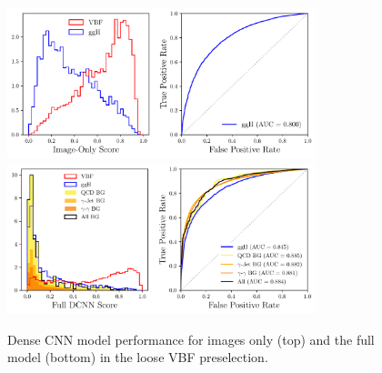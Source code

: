 %
\begin{figure}[h!]
    \begin{center}
    \includegraphics[width=0.8\textwidth]{figures/event_selection/imgonly_DCNN_LPS.pdf}
    \includegraphics[width=0.8\textwidth]{figures/event_selection/full_DCNN_LPS.pdf}
    \end{center}
    \caption{Dense CNN model performance for images only (top) and the full model (bottom) in the loose VBF preselection.}
    \label{fig:vbf_lps_appendix:image_only_DCNN}
\end{figure}
%
